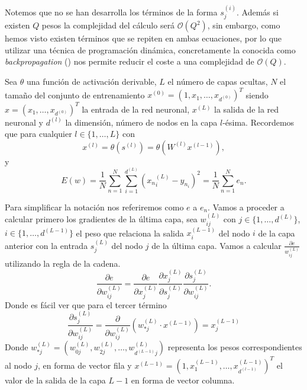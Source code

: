 Notemos que no se han desarrolla los términos de la forma $s^{(i)}_j$. Además si existen $Q$ pesos la complejidad del cálculo será $\mathcal{O}(Q^2)$, sin embargo, como hemos visto existen términos que se repiten en ambas ecuaciones, por lo que utilizar una técnica de programación dinámica, concretamente la conocida como 
\textit{backpropagation} (\cite{backpropagation-Hinton}) nos permite reducir el coste a una complejidad de  $\mathcal{O}(Q).$



Sea $\theta$ una función de activación derivable, 
 $L$ el número de capas ocultas, $N$ el tamaño del conjunto de entrenamiento $x^{(0)} = (1, x_1, \ldots, x_{d^{(0)}})^T$ 
siendo $x = (x_1, \ldots, x_{d^{(0)}})^T$ la entrada de la red neuronal, $x^{(L)}$ la salida de la red neuronal y 
$d^{(l)}$ la dimensión, número de nodos en la capa $l$-ésima. 
Recordemos que 
para cualquier $l \in \{1, \ldots, L\}$ con
\begin{equation}
    x^{(l)}
     = 
     \theta \left( s^{(l)}\right) 
     = 
     \theta \left( W^{(l)} x^{(l-1)}\right),
\end{equation}
y
\begin{equation}
    E(w) = \frac{1}{N} 
    \sum_{n = 1}^{N}
    \sum_{i = 1}^{d^{(L)}}
    \left({x_n}^{(L)}_i-y_{n_i} \right)^2 
    = 
    \frac{1}{N}
    \sum^{N}_{n=1} e_n.
\end{equation}

Para simplificar la notación nos referiremos como $e$ a $e_n.$
Vamos a proceder a calcular primero los gradientes de la última capa, 
sea $w^{(L)}_{i j}$  con $j \in \{1, \ldots , d^{(L)}\}$, 
$i \in \{1, \ldots , d^{(L-1)}\}$  el peso que relaciona la salida 
$x_i ^{(L-1)}$ del  
nodo $i$ de la capa anterior con la entrada $s_j ^{(L)}$ del nodo $j$ de la última capa. 
Vamos a calcular $\frac{\partial e}{ w^{(L)}_{i j}}$ utilizando la regla de la cadena. 
\begin{equation}
    \frac{\partial{e}}{\partial w^{(L)}_{i j}}
     = 
     \frac{\partial{e}}{\partial x^{(L)}_j} 
     \frac{\partial x^{(L)}_j}{\partial s^{(L)}_j} 
     \frac{\partial s^{(L)}_j}{\partial w^{(L)}_{i j}}.
\end{equation}
Donde es fácil ver que para el tercer término
\begin{equation}\label{eq:backpropagation_s_última_capa_derivada}
    \frac{\partial s^{(L)}_{j}}{\partial w^{(L)}_{i j}}
    = 
    \frac{\partial }{\partial w^{(L)}_{i j}}
    \left(
        w^{(L)}_{\ast j } \cdot x^{(L-1)}
    \right)
    = 
    x^{(L-1)}_j
\end{equation}
Donde $w^{(L)}_{\ast j} = \left(w^{(L)}_{0 j}, w^{(L)}_{2 j}, \ldots, w^{(L)}_{d^{(L-1)} j}\right)$ representa los pesos correspondientes al nodo $j$,
 en forma de  vector fila y $x^{(L-1)} = \left(1, x ^{(L-1)}_1, \ldots, x ^{(L-1)}_{d^{(l-1)}}\right)^T$ el valor de la salida de la capa $L-1$
 en forma de vector columna.
 
